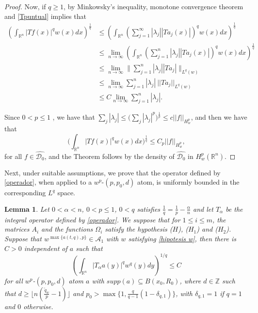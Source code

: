 \documentclass[a4paper,12pt,reqno]{amsart}
\numberwithin{equation}{section}
\newtheorem{lemma}[theorem]{Lemma}
\begin{document}
\begin{proof}
		Now, if $q\geq 1$, by Minkowsky's inequality, monotone convergence theorem and \eqref{Tpuntual} implies that 
		$$
		\begin{aligned}
			\left(\int_{\mathbb{R}^{n}} |Tf(x)|^{q} w(x) dx\right)^{\frac{1}{q}} &\leq \left(\int_{\mathbb{R}^{n}} \left(\sum_{j=1}^{\infty} |\lambda_j| |Ta_j(x)|\right)^{q} w(x) dx\right)^{\frac{1}{q}}\\
			&\leq  \lim_{n \to \infty} \left(\int_{\mathbb{R}^{n}} \left(\sum_{j=1}^{n} |\lambda_j| |Ta_j(x)|\right)^{q} w(x) dx\right)^{\frac{1}{q}}\\
			&\leq  \lim_{n \to \infty} \Big\| \sum_{j=1}^{n} |\lambda_j| |Ta_j| \Big\|_{L^{q}(w)}\\
			&\leq \lim_{n \to \infty} \sum_{j=1}^{n}|\lambda_j| \ || Ta_j||_{L^{q}(w)}\\
			&\leq C \lim_{n \to \infty} \sum_{j=1}^{n}|\lambda_j|.
		\end{aligned}
		$$
		
		Since $0<p\leq 1$ , we have that $\sum_j |\lambda_j| \leq \Big( \sum_j|\lambda_j|^{p}\Big)^{\frac{1}{p}} \leq c ||f||_{H^{p}_w}$, and then  we have that 
		$$ \Big(\int_{\mathbb{R}^{n}} |Tf(x)|^{q} w(x) dx \Big)^{\frac{1}{q}} \leq C_p ||f||_{H^{p}_w},$$
		for all $f \in \hat{\mathcal{D}_0}$, and the Theorem follows by the density of $\hat{\mathcal{D}_0}$ in $H^{p}_w(\mathbb{R}^{n})$.
	\end{proof}
	
	\medskip
	
	Next, under suitable assumptions, we prove that the operator defined by \eqref{operador}, when applied to a $w^{p}$-$(p,p_0,d)$ atom, is uniformly bounded in the corresponding $L^q$ space. 
	
	\begin{lemma}\label{TL}
		Let $0< \alpha<n$, $0 < p \leq 1$, $0< q$ satisfies $\frac 1q=\frac 1p-\frac {\alpha}n$ and let $T_\alpha$ be the integral operator defined by \eqref{operador}. We suppose that for $1\leq i\leq m$, the matrices $A_i$ and the functions $\Omega_i$ satisfy the hypothesis ($H$), ($H_1$) and ($H_2$). Suppose that  $w^{\max\{a(t,q), p\}} \in \mathcal{A}_1$ with $w$ satisfying \eqref{hipotesis w}, then there is $C>0$ independent of $a$ such that
		$$
		\left(\int_{\mathbb{R}^{n}} |T_\alpha a(y)|^qw^q(y)dy\right)^{1/q} \leq C  
		$$
		for all $w^{p}$-$(p,p_0,d)$ atom $a$ with $supp(a) \subseteq B(x_0,R_0)$, where  $d \in \mathbb{Z}$ such that $d \geq \lfloor n ( \frac{\tilde{q}_w}{p}-1)\rfloor $ and  $p_0> \max\{1,\frac{q}{q-1}(1-\delta_{q,1})\}$, with $\delta_{q,1}=1$ if $q=1$ and $0$ otherwise.
	\end{lemma}
	
\end{document}
